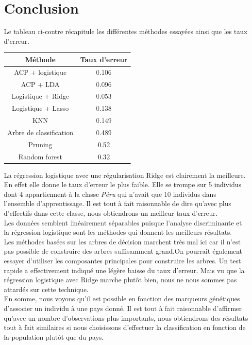 \documentclass[12pt,a4paper]{article}
\begin{document}
\section{Conclusion}
Le tableau ci-contre récapitule les différentes méthodes essayées ainsi que les taux d'erreur.
\begin{center}
	\begin{tabular}{|c|c|}
		\hline
		Méthode & Taux d'erreur \\ \hline
		ACP + logistique & 0.106 \\ \hline
		ACP + LDA & 0.096 \\ \hline
		Logistique + Ridge & 0.053 \\ \hline
		Logistique + Lasso & 0.138 \\ \hline
		KNN & 0.149 \\ \hline
		Arbre de classification & 0.489 \\ \hline
		Pruning & 0.52 \\ \hline
		Random forest & 0.32 \\ \hline
	\end{tabular}
	\label{tab:resume}
\end{center}
La régression logistique avec une régularisation Ridge est clairement la meilleure. En effet elle donne le taux d'erreur le plus faible. Elle se trompe sur 5 individus dont 4 appartiennent à la classe \textit{Péru} qui n'avait que 10 individus dans l'ensemble d'apprentissage. Il est tout à fait raisonnable de dire qu'avec plus d'effectifs dans cette classe, nous obtiendrons un meilleur taux d'erreur.\vspace{3mm}\\
Les données semblent linéairement séparables puisque l'analyse discriminante et la régression logistique sont les méthodes qui donnent les meilleurs résultats.\\
Les méthodes basées sur les arbres de décision marchent très mal ici car il n'est pas possible de construire des arbres suffisamment grand.On pourrait également essayer d'utiliser les composantes principales pour construire les arbres. Un test rapide a effectivement indiqué une légère baisse du taux d'erreur. Mais vu que la régression logistique avec Ridge marche plutôt bien, nous ne nous sommes pas attardés sur cette technique.\vspace{3mm}\\
En somme, nous voyons qu'il est possible en fonction des marqueurs génétiques d'associer un individu à une pays donné. Il est tout à fait raisonnable d'affirmer qu'avec un nombre d'observations plus importants, nous obtiendrons des résultats tout à fait similaires si nous choisissons d'effectuer la classification en fonction de la population plutôt que du pays.
\end{document}

